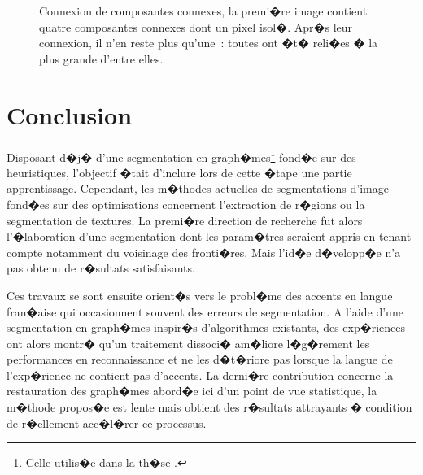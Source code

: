             \begin{figure}[ht]
        $$\begin{array}{|c|c|} \hline
        \texttt{[image: \\filext\{../image/image/conal1]}} &
        \texttt{[image: \\filext\{../image/image/conal2]}} \\
        $(a)$ & $(b)$ \\ \hline
        \end{array}$$
        \caption{    Connexion de composantes connexes, la premi�re image contient quatre composantes
                            connexes dont un pixel isol�. Apr�s leur connexion, il n'en reste plus qu'une~:
                            toutes ont �t� reli�es � la plus grande d'entre elles.}
        \label{image_connexion_composante_connexion_a}
            \end{figure}














\section{Conclusion}
\label{image_conclusion}


Disposant d�j� d'une segmentation en graph�mes\footnote{Celle utilis�e dans la th�se .} fond�e sur des heuristiques, l'objectif �tait d'inclure lors de cette �tape une partie apprentissage. Cependant, les m�thodes actuelles de segmentations d'image fond�es sur des optimisations concernent l'extraction de r�gions ou la segmentation de textures. La premi�re direction de recherche fut alors l'�laboration d'une segmentation dont les param�tres seraient appris en tenant compte notamment du voisinage des fronti�res. Mais l'id�e d�velopp�e n'a pas obtenu de r�sultats satisfaisants. 

Ces travaux se sont ensuite orient�s vers le probl�me des accents en langue fran�aise qui occasionnent souvent des erreurs de segmentation. A l'aide d'une segmentation en graph�mes inspir�s d'algorithmes existants, des exp�riences ont alors montr� qu'un traitement dissoci� am�liore l�g�rement les performances en reconnaissance et ne les d�t�riore pas lorsque la langue de l'exp�rience ne contient pas d'accents. La derni�re contribution concerne la restauration des graph�mes abord�e ici d'un point de vue statistique, la m�thode propos�e est lente mais obtient des r�sultats attrayants � condition de r�ellement acc�l�rer ce processus.


